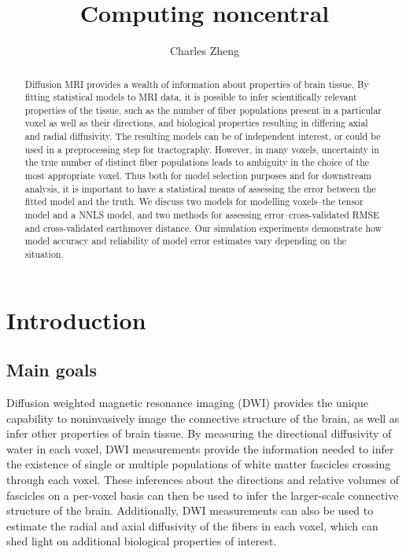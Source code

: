 \documentclass[11pt]{article}
\begin{document}
\newcommand{\tr}{\text{tr}}
\newcommand{\E}{\textbf{E}}
\newcommand{\diag}{\text{diag}}
\newcommand{\argmax}{\text{argmax}}
\newcommand{\Cov}{\text{Cov}}
\pagestyle{fancy}

\title{Computing noncentral}

\author{Charles Zheng}

\maketitle

\begin{abstract}
Diffusion MRI provides a wealth of information about properties of
brain tissue.  By fitting statistical models to MRI data, it is
possible to infer scientifically relevant properties of the tissue,
such as the number of fiber populations present in a particular voxel
as well as their directions, and biological properties resulting in
differing axial and radial diffusivity.  The resulting models can be
of independent interest, or could be used in a preprocessing step for
tractography.  However, in many voxels, uncertainty in
the true number of distinct fiber populations leads to ambiguity in
the choice of the most appropriate voxel.
Thus both for model selection purposes and for downstream analysis,
it is important to have a statistical means of assessing the
error between the fitted model and the truth.  We discuss two models
for modelling voxels--the tensor model and a NNLS model, and two
methods for assessing error--cross-validated RMSE and cross-validated
earthmover distance.  Our simulation experiments demonstrate how model
accuracy and reliability of model error estimates vary depending on
the situation.
\end{abstract}

\section{Introduction}

\subsection{Main goals}

Diffusion weighted magnetic resonance imaging (DWI) provides the
unique capability to noninvasively image the connective structure of
the brain, as well as infer other properties of brain tissue.
By measuring the directional diffusivity of water in each voxel, DWI
measurements provide the information needed to infer the existence of
single or multiple populations of white matter fascicles crossing
through each voxel.
These inferences about the directions and relative volumes of
fascicles on a per-voxel basis can then be used to infer the
larger-scale connective structure of the brain.
Additionally, DWI measurements can also be used to estimate the radial
and axial diffusivity of the fibers in each voxel, which can shed
light on additional biological properties of interest.\cite{Rokem2013}
\cite{Pestilli2013}\cite{Behrens2009}
\end{document}
